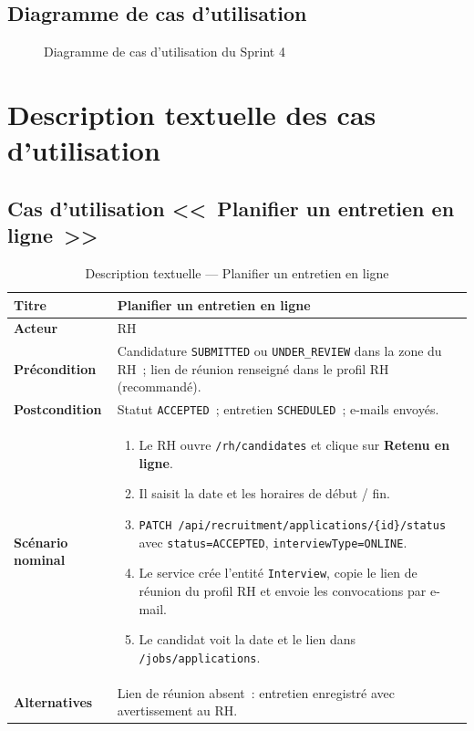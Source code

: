 \subsection{Diagramme de cas d'utilisation}

\begin{figure}[H]
  \centering
  \caption{Diagramme de cas d'utilisation du Sprint 4}
  \label{fig:uc-sprint4}
\end{figure}


\section{Description textuelle des cas d'utilisation}

\subsection{Cas d'utilisation <<~Planifier un entretien en ligne~>>}

\begin{table}[htbp]
  \centering
  \small
  \caption{Description textuelle --- Planifier un entretien en ligne}
  \label{tab:uc-online-interview}
  \begin{tabular}{|p{3.0cm}|p{10.2cm}|}
    \hline
    \textbf{Titre} & Planifier un entretien en ligne \\
    \hline
    \textbf{Acteur} & RH \\
    \hline
    \textbf{Précondition} & Candidature \texttt{SUBMITTED} ou \texttt{UNDER\_REVIEW}
          dans la zone du RH~; lien de réunion renseigné dans le profil RH (recommandé). \\
    \hline
    \textbf{Postcondition} & Statut \texttt{ACCEPTED}~; entretien \texttt{SCHEDULED}~;
          e-mails envoyés. \\
    \hline
    \textbf{Scénario nominal}
    &
    \begin{enumerate}[leftmargin=*,itemsep=0.15em,topsep=0.2em]
      \item Le RH ouvre \texttt{/rh/candidates} et clique sur \textbf{Retenu en ligne}.
      \item Il saisit la date et les horaires de début / fin.
      \item \texttt{PATCH /api/recruitment/applications/\{id\}/status} avec
            \texttt{status=ACCEPTED}, \texttt{interviewType=ONLINE}.
      \item Le service crée l'entité \texttt{Interview}, copie le lien de
            réunion du profil RH et envoie les convocations par e-mail.
      \item Le candidat voit la date et le lien dans \texttt{/jobs/applications}.
    \end{enumerate}
    \\
    \hline
    \textbf{Alternatives}
    & Lien de réunion absent~: entretien enregistré avec avertissement au RH. \\
    \hline
  \end{tabular}
\end{table}


